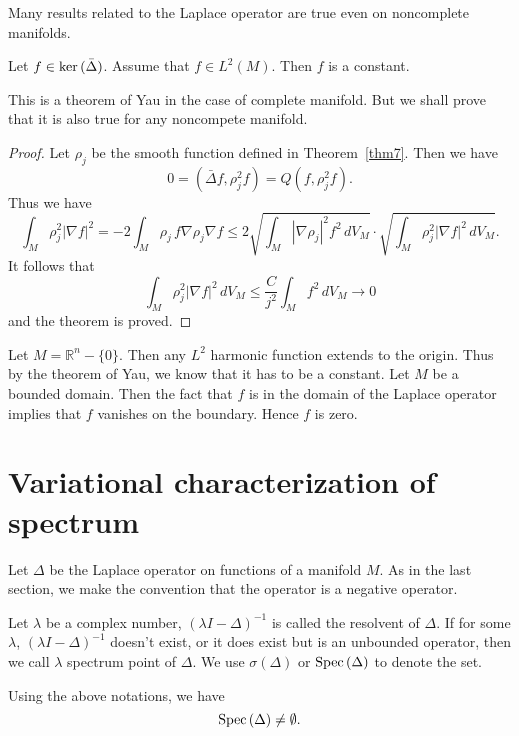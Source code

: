 Many results related to the Laplace operator are true even on noncomplete manifolds. 

\begin{theorem}
Let $f\in {\rm ker}\,(\bar\Delta)$. Assume that $f\in L^2(M)$. Then $f$ is a constant. 
\end{theorem}

This is a theorem of Yau in the case of complete manifold. But we shall prove that it is also true for any noncompete manifold.


\begin{proof}
Let $\rho_j$ be the smooth function defined in Theorem~\ref{thm7}. Then we have
\[
0=(\bar\Delta f, \rho_j^2 f)=Q(f,\rho_j^2 f).
\]
Thus we have
\[
\int_M\rho_j^2|\nabla f|^2=-2\int_M \rho_j\, f\nabla\rho_j\nabla f\leq 2\sqrt{\int_M|\nabla \rho_j|^2 f^2\, dV_M}
\cdot\sqrt{\int_M\rho_j^2|\nabla f|^2\, dV_M}.
\]
It follows that 
\[
\int_M\rho_j^2|\nabla f|^2\,dV_M\leq \frac{C}{j^2}\int_Mf^2\, dV_M\to 0
\]
and the theorem is proved. 


\end{proof}

\begin{example}
Let $M=\mathbb R^n-\{0\}$. Then any $L^2$ harmonic function extends to the origin. Thus by the theorem of Yau, we know that it has to be a constant. Let $M$ be a bounded domain. Then the fact that $f$ is in the domain of the Laplace operator implies that $f$ vanishes on the boundary. Hence $f$ is zero.
\end{example}


\section{Variational characterization of spectrum}
Let $\Delta$ be the Laplace operator on functions of a manifold $M$. As in the last section, we make the convention that the operator is a negative operator.

Let $\lambda$ be a complex number, $(\lambda I-\Delta)^{-1}$ is called the resolvent of $\Delta$. If for some $\lambda$, $(\lambda I-\Delta)^{-1}$ doesn't exist, or it does exist but is an unbounded operator, then we call $\lambda$  spectrum point of $\Delta$. We use $\sigma(\Delta)$ or ${\rm Spec}\, (\Delta)$ to denote the set.

\begin{theorem} Using the above notations, we have
\[
{\rm Spec} \,(\Delta)\neq\emptyset.
\]
\end{theorem}

